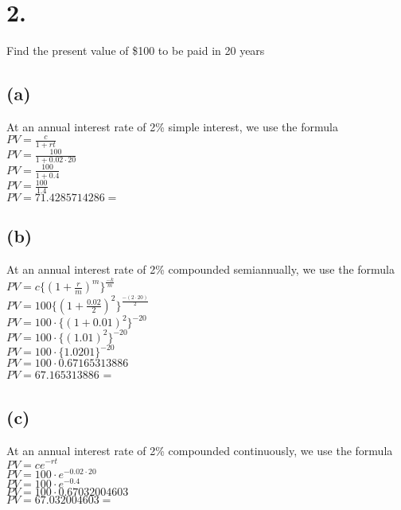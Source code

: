 \documentclass{article}
\begin{document}
\section*{2.}
{\Large

Find the present value of \$100 to be paid in 20 years

\subsection*{(a)}

At an annual interest rate of 2\% simple interest, we use the formula \\
$PV = \frac{c}{1 + rt}$ \\
$PV = \frac{100}{1 + 0.02 \cdot 20}$ \\
$PV = \frac{100}{1 + 0.4}$ \\
$PV = \frac{100}{1.4}$ \\
$PV = 71.4285714286 = $ 

\subsection*{(b)}

At an annual interest rate of 2\% compounded semiannually, we use the formula \\
$PV = c \{(1 + \frac{r}{m})^m\}^{\frac{-k}{m}}$ \\
$PV = 100 \{(1 + \frac{0.02}{2})^2\}^{\frac{-(2 \cdot 20)}{2}}$ \\
$PV = 100 \cdot \{(1 + 0.01)^2\}^{-20}$ \\
$PV = 100 \cdot \{(1.01)^2\}^{-20}$ \\
$PV = 100 \cdot \{1.0201\}^{-20}$ \\
$PV = 100 \cdot 0.67165313886$ \\
$PV = 67.165313886$ = 

\subsection*{(c)}

At an annual interest rate of 2\% compounded continuously, we use the formula \\
$PV = ce^{-rt}$ \\
$PV = 100 \cdot e^{-0.02 \cdot 20}$ \\
$PV = 100 \cdot e^{-0.4}$ \\
$PV = 100 \cdot 0.67032004603$ \\
$PV = 67.032004603 = $ 

}
\end{document}
